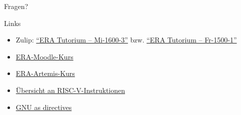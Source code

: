 \begin{frame}[c]{}{}
	\begin{center}
		\LARGE Fragen?
	\end{center}
\end{frame}


\begin{frame}[c, fragile]{Links}{}
	\begin{itemize}
		\item Zulip: \href{https://zulip.in.tum.de/#narrow/channel/3255-ERA-Tutorium-.E2.80.93-Mi-1600-3}{\enquote{ERA Tutorium -- Mi-1600-3}}
		      bzw. \href{https://zulip.in.tum.de/#narrow/channel/3264-ERA-Tutorium-.E2.80.93-Fr-1500-1}{\enquote{ERA Tutorium -- Fr-1500-1}}
		\item \href{https://www.moodle.tum.de/course/view.php?id=111440}{ERA-Moodle-Kurs}
		\item \href{https://artemis.tum.de/courses/516}{ERA-Artemis-Kurs}
		\item \href{https://msyksphinz-self.github.io/riscv-isadoc/html/index.html}{Übersicht an RISC-V-Instruktionen}
		\item \href{https://ftp.gnu.org/old-gnu/Manuals/gas/html_chapter/as_7.html}{GNU as directives}
	\end{itemize}
\end{frame}

\maketitle


